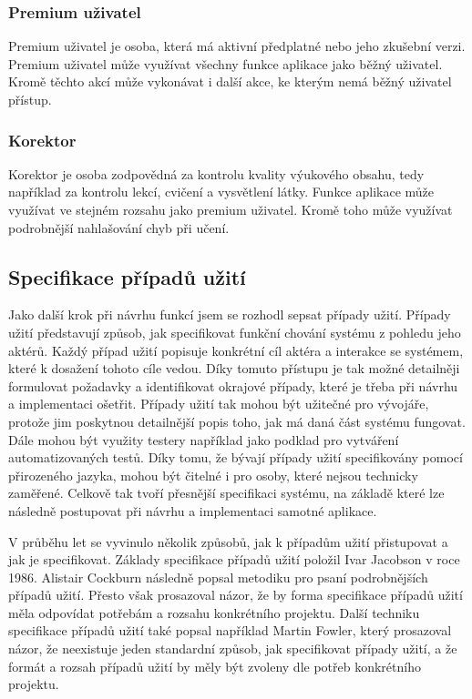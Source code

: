 \subsubsection{Premium uživatel}

Premium uživatel je osoba, která má aktivní předplatné nebo jeho zkušební verzi. Premium uživatel může využívat všechny funkce aplikace jako běžný uživatel. Kromě těchto akcí může vykonávat i další akce, ke kterým nemá běžný uživatel přístup.

\subsubsection{Korektor}

Korektor je osoba zodpovědná za kontrolu kvality výukového obsahu, tedy například za kontrolu lekcí, cvičení a vysvětlení látky. Funkce aplikace může využívat ve stejném rozsahu jako premium uživatel. Kromě toho může využívat podrobnější nahlašování chyb při učení.

\subsection{Specifikace případů užití}

Jako další krok při návrhu funkcí jsem se rozhodl sepsat případy užití. Případy užití představují způsob, jak specifikovat funkční chování systému z pohledu jeho aktérů. Každý případ užití popisuje konkrétní cíl aktéra a interakce se systémem, které k dosažení tohoto cíle vedou. Díky tomuto přístupu je tak možné detailněji formulovat požadavky a identifikovat okrajové případy, které je třeba při návrhu a implementaci ošetřit. Případy užití tak mohou být užitečné pro vývojáře, protože jim poskytnou detailnější popis toho, jak má daná část systému fungovat. Dále mohou být využity testery například jako podklad pro vytváření automatizovaných testů. Díky tomu, že bývají případy užití specifikovány pomocí přirozeného jazyka, mohou být čitelné i pro osoby, které nejsou technicky zaměřené. Celkově tak tvoří přesnější specifikaci systému, na základě které lze následně postupovat při návrhu a implementaci samotné aplikace. \cite{UseCases}

V průběhu let se vyvinulo několik způsobů, jak k případům užití přistupovat a jak je specifikovat. Základy specifikace případů užití položil Ivar Jacobson v roce 1986. Alistair Cockburn \cite{Cockburn2001WritingEffectiveUseCases} následně popsal metodiku pro psaní podrobnějších případů užití. Přesto však prosazoval názor, že by forma specifikace případů užití měla odpovídat potřebám a rozsahu konkrétního projektu. Další techniku specifikace případů užití také popsal například Martin Fowler, který prosazoval názor, že neexistuje jeden standardní způsob, jak specifikovat případy užití, a že formát a rozsah případů užití by měly být zvoleny dle potřeb konkrétního projektu. \cite[22-27]{NURUIDesignSteps}

